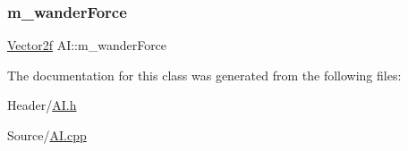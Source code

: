 \mbox{\label{class_a_i_ad68c628e218a76dc48d50cba41cd8c54}} 
\subsubsection{\texorpdfstring{m\_wanderForce}{m\_wanderForce}}
{\footnotesize\ttfamily \mbox{\hyperlink{class_vector2f}{Vector2f}} A\+I\+::m\+\_\+wander\+Force\hspace{0.3cm}{\ttfamily [protected]}}



The documentation for this class was generated from the following files\+:\begin{DoxyCompactItemize}
\item 
Header/\mbox{\hyperlink{_a_i_8h}{A\+I.\+h}}\item 
Source/\mbox{\hyperlink{_a_i_8cpp}{A\+I.\+cpp}}\end{DoxyCompactItemize}
